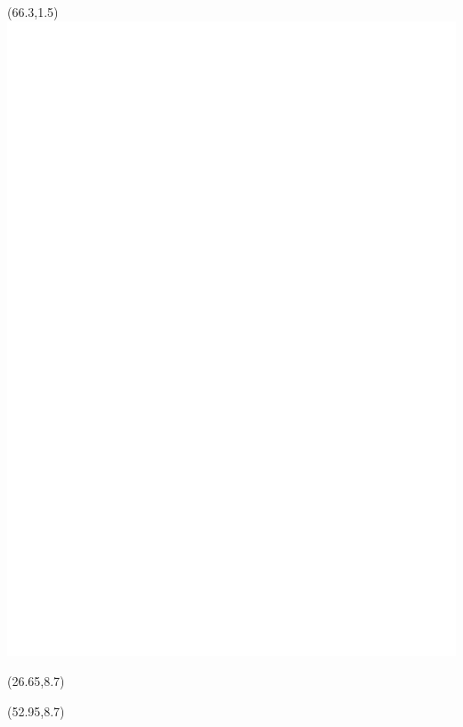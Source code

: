 \documentclass[final,hyperref={pdfpagelabels=false}]{beamer}
\begin{document}
\begin{textblock}{14}(66.3,1.5)
\includegraphics[trim=0 0 0 0,clip,scale=.8]{./img/EDFLAB_LOGO_blanc}
\end{textblock}

\begin{textblock}{0.1}(26.65,8.7)
\vrule width 1pt height 86cm
\end{textblock}

\begin{textblock}{0.1}(52.95,8.7)
\vrule width 1pt height 86cm
\end{textblock}
\end{document}
